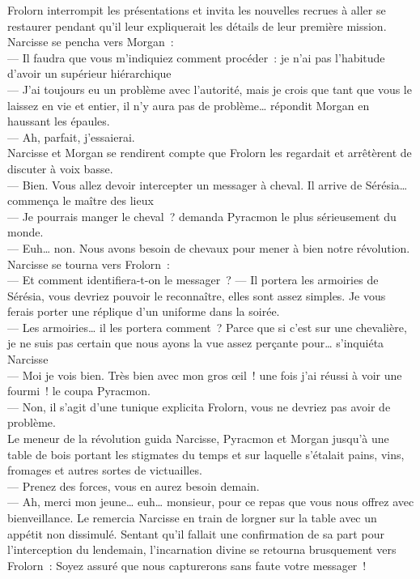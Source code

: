 \documentclass[french, a4paper, 12pt]{article}
\begin{document}
Frolorn interrompit les présentations et invita les nouvelles recrues à aller se restaurer pendant qu'il leur expliquerait les détails de leur première mission. Narcisse se pencha vers Morgan~:\\
--- Il faudra que vous m'indiquiez comment procéder~: je n'ai pas l'habitude d'avoir un supérieur hiérarchique\\
--- J'ai toujours eu un problème avec l'autorité, mais je crois que tant que vous le laissez en vie et entier, il n'y aura pas de problème… répondit Morgan en haussant les épaules.\\
--- Ah, parfait, j'essaierai.\\
Narcisse et Morgan se rendirent compte que Frolorn les regardait et arrêtèrent de discuter à voix basse.\\
--- Bien. Vous allez devoir intercepter un messager à cheval. Il arrive de Sérésia… commença le maître des lieux\\
--- Je pourrais manger le cheval~? demanda Pyracmon le plus sérieusement du monde.\\
--- Euh… non. Nous avons besoin de chevaux pour mener à bien notre révolution.\\
Narcisse se tourna vers Frolorn~:\\
--- Et comment identifiera-t-on le messager~?
--- Il portera les armoiries de Sérésia, vous devriez pouvoir le reconnaître, elles sont assez simples. Je vous ferais porter une réplique d'un uniforme dans la soirée.\\
--- Les armoiries… il les portera comment~? Parce que si c'est sur une chevalière, je ne suis pas certain que nous ayons la vue assez perçante pour… s'inquiéta Narcisse\\
--- Moi je vois bien. Très bien avec mon gros œil~! une fois j'ai réussi à voir une fourmi~! le coupa Pyracmon.\\
--- Non, il s'agit d'une tunique explicita Frolorn, vous ne devriez pas avoir de problème.\\

Le meneur de la révolution guida Narcisse, Pyracmon et Morgan jusqu'à une table de bois portant les stigmates du temps et sur laquelle s'étalait pains, vins, fromages et autres sortes de victuailles.\\
--- Prenez des forces, vous en aurez besoin demain.\\
--- Ah, merci mon jeune… euh… monsieur, pour ce repas que vous nous offrez avec bienveillance. Le remercia Narcisse en train de lorgner sur la table avec un appétit non dissimulé. Sentant qu'il fallait une confirmation de sa part pour l'interception du lendemain, l'incarnation divine se retourna brusquement vers Frolorn~: Soyez assuré que nous capturerons sans faute votre messager~!\\
\end{document}
